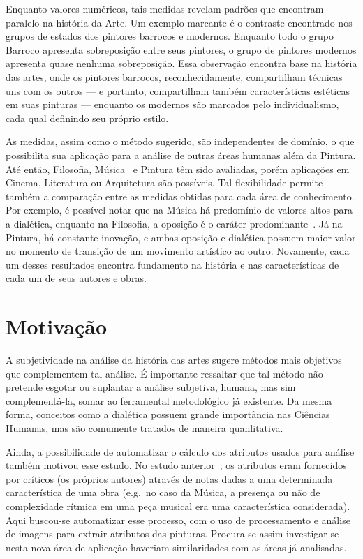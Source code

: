 Enquanto valores numéricos, tais medidas revelam padrões que encontram
paralelo na história da Arte. Um exemplo marcante é o contraste
encontrado nos grupos de estados dos pintores barrocos e
modernos. Enquanto todo o grupo Barroco apresenta sobreposição entre
seus pintores, o grupo de pintores modernos apresenta quase nenhuma
sobreposição. Essa observação encontra base na história das artes,
onde os pintores barrocos, reconhecidamente, compartilham técnicas uns
com os outros --- e portanto, compartilham também características
estéticas em suas pinturas --- enquanto os modernos são marcados pelo
individualismo, cada qual definindo seu próprio estilo.

As medidas, assim como o método sugerido, são independentes de
domínio, o que possibilita sua aplicação para a análise de outras
áreas humanas além da Pintura. Até então, Filosofia,
Música~\cite{vieira} e Pintura têm sido avaliadas, porém aplicações em
Cinema, Literatura ou Arquitetura são possíveis. Tal flexibilidade
permite também a comparação entre as medidas obtidas para cada área de
conhecimento. Por exemplo, é possível notar que na Música há
predomínio de valores altos para a dialética, enquanto na Filosofia, a
oposição é o caráter predominante~\cite{vieira}. Já na Pintura, há
constante inovação, e ambas oposição e dialética possuem maior valor
no momento de transição de um movimento artístico ao outro. Novamente,
cada um desses resultados encontra fundamento na história e nas
características de cada um de seus autores e obras.

\section{Motivação}

A subjetividade na análise da história das artes sugere métodos mais
objetivos que complementem tal análise. É importante ressaltar que tal
método não pretende esgotar ou suplantar a análise subjetiva, humana,
mas sim complementá-la, somar ao ferramental metodológico já
existente. Da mesma forma, conceitos como a dialética possuem grande
importância nas Ciências Humanas, mas são comumente tratados de
maneira quanlitativa.

Ainda, a possibilidade de automatizar o cálculo dos atributos usados
para análise também motivou esse estudo. No estudo
anterior~\cite{vieira}, os atributos eram fornecidos por críticos (os
próprios autores) através de notas dadas a uma determinada
característica de uma obra (e.g.\ no caso da Música, a presença ou não
de complexidade rítmica em uma peça musical era uma característica
considerada). Aqui buscou-se automatizar esse processo, com o uso de
processamento e análise de imagens para extrair atributos das
pinturas. Procura-se assim investigar se nesta nova área de aplicação
haveriam similaridades com as áreas já analisadas.

